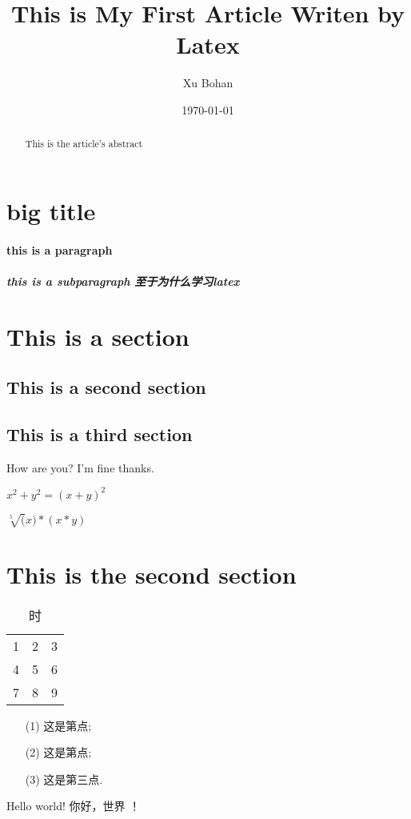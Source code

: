\documentclass[a4paper]{article}
\title{This is My First Article Writen by Latex}
\author{Xu Bohan}
\date{\today}
\begin{document}
    \maketitle

    \begin{abstract}
        This is the article's abstract
    \end{abstract}

    \tableofcontents
    \newpage


    \section{big title}\label{sec:big-title}

    \paragraph{this is a paragraph}

    \subparagraph{this is a subparagraph 至于为什么学习latex}


    \section{This is a section}\label{sec:this-is-a-section}

    \subsection{This is a second section}\label{subsec:this-is-a-second-section}
    \subsection[short]{This is a third section}\label{subsec:this-is-a-third-section}
    How are you?
    I'm fine thanks.

    $x^2+y^2 = (x+y)^2$

    $\sqrt[5](x)*(x*y)$


    \section{This is the second section}\label{sec:this-is-the-second-section}
    \begin{table}[htbp]
        \centering
        \caption{时}
        \begin{tabular}{ccc}
            1 & 2 & 3 \\
            4 & 5 & 6 \\
            7 & 8 & 9
        \end{tabular}\label{tab:table}
    \end{table}

    \begin{enumerate}
        \item[(1)] 这是第点;
        \item[(2)] 这是第点;
        \item[(3)] 这是第三点.
    \end{enumerate}

    Hello world!
    你好，世界 ！
\end{document}
